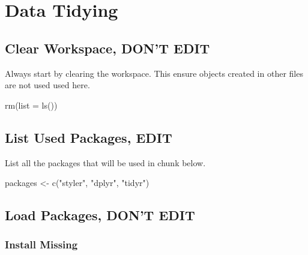 \documentclass[
  letterpaper,
  DIV=11,
  numbers=noendperiod]{scrreprt}
\newenvironment{Shaded}{\begin{snugshade}}{\end{snugshade}}
\newcommand{\AttributeTok}[1]{\textcolor[rgb]{0.40,0.45,0.13}{#1}}
\newcommand{\FunctionTok}[1]{\textcolor[rgb]{0.28,0.35,0.67}{#1}}
\newcommand{\NormalTok}[1]{\textcolor[rgb]{0.00,0.23,0.31}{#1}}
\newcommand{\OtherTok}[1]{\textcolor[rgb]{0.00,0.23,0.31}{#1}}
\newcommand{\StringTok}[1]{\textcolor[rgb]{0.13,0.47,0.30}{#1}}
\begin{document}
\chapter{Data Tidying}\label{data-tidying}

\section*{Clear Workspace, DON'T
EDIT}\label{clear-workspace-dont-edit-7}


Always start by clearing the workspace. This ensure objects created in
other files are not used used here.

\begin{Shaded}
\begin{Highlighting}[]
\FunctionTok{rm}\NormalTok{(}\AttributeTok{list =} \FunctionTok{ls}\NormalTok{())}
\end{Highlighting}
\end{Shaded}

\section*{List Used Packages, EDIT}\label{list-used-packages-edit-7}


List all the packages that will be used in chunk below.

\begin{Shaded}
\begin{Highlighting}[]
\NormalTok{packages }\OtherTok{\textless{}{-}} \FunctionTok{c}\NormalTok{(}\StringTok{"styler"}\NormalTok{, }\StringTok{"dplyr"}\NormalTok{, }\StringTok{"tidyr"}\NormalTok{)}
\end{Highlighting}
\end{Shaded}

\section*{Load Packages, DON'T EDIT}\label{sec-packages}


\subsection*{Install Missing}\label{install-missing-7}
\end{document}

